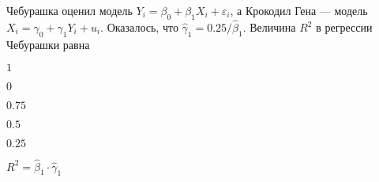 
\begin{question}
Чебурашка оценил модель \(Y_i = \beta_0 + \beta_1 X_i + \varepsilon_i\),
а Крокодил Гена --- модель \(X_i = \gamma_0 + \gamma_1 Y_i + u_i\).
Оказалось, что \(\hat\gamma_1 = 0.25/\hat\beta_1\). Величина \(R^2\) в
регрессии Чебурашки равна
\begin{answerlist}
  \item \(1\)
  \item \(0\)
  \item \(0.75\)
  \item \(0.5\)
  \item \(0.25\)
\end{answerlist}
\end{question}

\begin{solution}
\(R^2 = \hat\beta_1 \cdot \hat\gamma_1\)
\end{solution}

